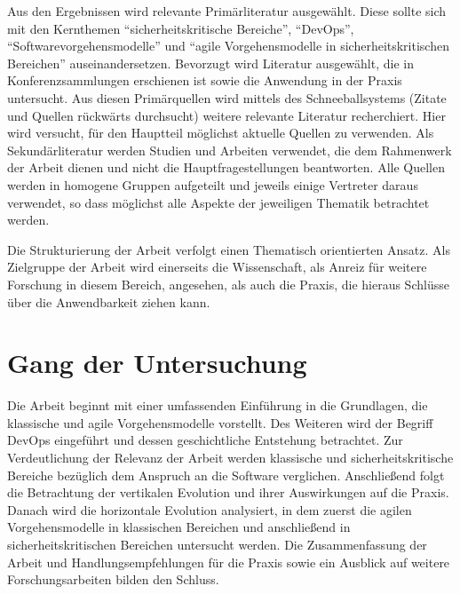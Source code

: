 Aus den Ergebnissen wird relevante Primärliteratur ausgewählt. 
Diese sollte sich mit den Kernthemen \enquote{sicherheitskritische Bereiche}, \enquote{DevOps}, \enquote{Softwarevorgehensmodelle} und \enquote{agile Vorgehensmodelle in sicherheitskritischen Bereichen} auseinandersetzen.
Bevorzugt wird Literatur ausgewählt, die in Konferenzsammlungen erschienen ist sowie die Anwendung in der Praxis untersucht.
Aus diesen Primärquellen wird mittels des Schneeballsystems (Zitate und Quellen rückwärts durchsucht) weitere relevante Literatur recherchiert.
Hier wird versucht, für den Hauptteil möglichst aktuelle Quellen zu verwenden.
Als Sekundärliteratur werden Studien und Arbeiten verwendet, die dem Rahmenwerk der Arbeit dienen und nicht die Hauptfragestellungen beantworten.
Alle Quellen werden in homogene Gruppen aufgeteilt und jeweils einige Vertreter daraus verwendet, so dass möglichst alle Aspekte der jeweiligen Thematik betrachtet werden.

Die Strukturierung der Arbeit verfolgt einen Thematisch orientierten Ansatz. 
Als Zielgruppe der Arbeit wird einerseits die Wissenschaft, als Anreiz für weitere Forschung in diesem Bereich, angesehen, als auch die Praxis, die hieraus Schlüsse über die Anwendbarkeit ziehen kann.

\section{Gang der Untersuchung}

Die Arbeit beginnt mit einer umfassenden Einführung in die Grundlagen, die klassische und agile Vorgehensmodelle vorstellt.
Des Weiteren wird der Begriff DevOps eingeführt und dessen geschichtliche Entstehung betrachtet.
Zur Verdeutlichung der Relevanz der Arbeit werden klassische und sicherheitskritische Bereiche bezüglich dem Anspruch an die Software verglichen.
Anschließend folgt die Betrachtung der vertikalen Evolution und ihrer Auswirkungen auf die Praxis.
Danach wird die horizontale Evolution analysiert, in dem zuerst die agilen Vorgehensmodelle in klassischen Bereichen und anschließend in sicherheitskritischen Bereichen untersucht werden.
Die Zusammenfassung der Arbeit und Handlungsempfehlungen für die Praxis sowie ein Ausblick auf weitere Forschungsarbeiten bilden den Schluss.



